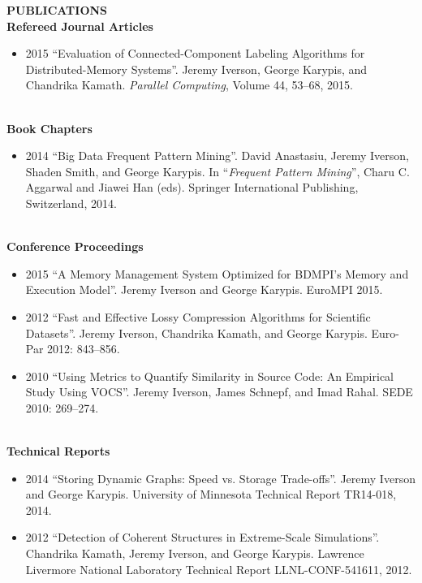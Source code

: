 \documentclass[a4paper,12pt]{article}
\newcommand{\lskip}[1]{\hspace*{1em}\\[#1\baselineskip]}
\newenvironment{Itemize}[0]{
  \vspace{-\parskip}\begin{itemize}
}{
  \end{itemize}
}
\begin{document}
\textbf{PUBLICATIONS}
\lskip{1}
%
\textbf{Refereed Journal Articles}
\begin{Itemize}
  \item[2015] ``Evaluation of Connected-Component Labeling Algorithms for
              Distributed-Memory Systems''. Jeremy Iverson, George Karypis, and
              Chandrika Kamath. \textit{Parallel Computing}, Volume 44, 53--68,
              2015.
\end{Itemize}
%
\lskip{-2}
%
\textbf{Book Chapters}
\begin{Itemize}
  \item[2014] ``Big Data Frequent Pattern Mining''. David Anastasiu, Jeremy
              Iverson, Shaden Smith, and George Karypis. In ``\textit{Frequent
              Pattern Mining}'', Charu C. Aggarwal and Jiawei Han (eds).
              Springer International Publishing, Switzerland, 2014.
\end{Itemize}
%
\lskip{-2}
%
\textbf{Conference Proceedings}
\begin{Itemize}
  \item[2015] ``A Memory Management System Optimized for BDMPI's Memory and
              Execution Model''. Jeremy Iverson and George Karypis. EuroMPI
              2015.
  \item[2012] ``Fast and Effective Lossy Compression Algorithms for Scientific
              Datasets''. Jeremy Iverson, Chandrika Kamath, and George Karypis.
              Euro-Par 2012: 843--856.
  \item[2010] ``Using Metrics to Quantify Similarity in Source Code: An
              Empirical Study Using VOCS''. Jeremy Iverson, James Schnepf, and
              Imad Rahal. SEDE 2010: 269--274.
\end{Itemize}
%
\lskip{-2}
%
\textbf{Technical Reports}
\begin{Itemize}
  \item[2014] ``Storing Dynamic Graphs: Speed vs. Storage Trade-offs''. Jeremy
              Iverson and George Karypis. University of Minnesota Technical
              Report TR14-018, 2014.
  \item[2012] ``Detection of Coherent Structures in Extreme-Scale
              Simulations''. Chandrika Kamath, Jeremy Iverson, and George
              Karypis. Lawrence Livermore National Laboratory Technical Report
              LLNL-CONF-541611, 2012.
\end{Itemize}
\end{document}
